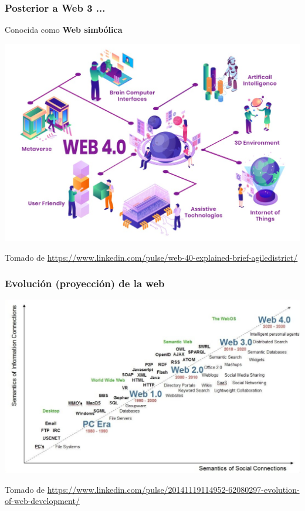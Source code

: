 \documentclass[
10pt, %
aspectratio=169, %
]{beamer}
\begin{document}
	\begin{frame}
		
		\frametitle{Posterior a Web 3 ...}
		
		
		\centering
		
		Conocida como \textbf{Web simbólica}
		
		\includegraphics[scale=0.25]{web_4.jpeg} 
		
		{\scriptsize Tomado de \url{https://www.linkedin.com/pulse/web-40-explained-brief-agiledistrict/}}
		
	\end{frame}
	
	\begin{frame}
		
		\frametitle{Evolución (proyección) de la web}
		
		\centering
		\includegraphics[scale=0.33]{evolucion.png} 
		
		{\scriptsize Tomado de \url{https://www.linkedin.com/pulse/20141119114952-62080297-evolution-of-web-development/}}
		
	\end{frame}
	
\end{document}
